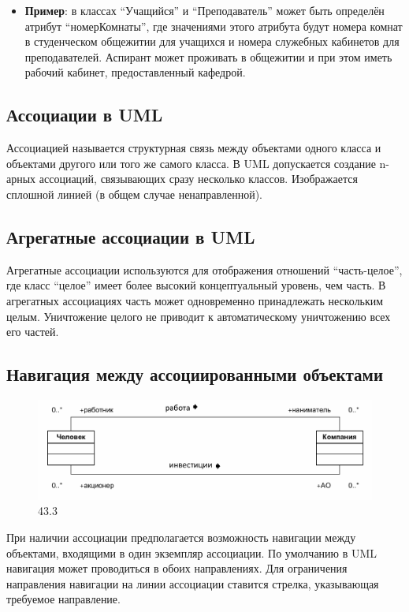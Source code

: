 \documentclass[a4paper,12pt]{article}
\begin{document}
\begin{itemize}
    \item \textbf{Пример}: в классах ``Учащийся'' и ``Преподаватель'' может быть определён атрибут ``номерКомнаты'', где значениями этого атрибута будут номера комнат в студенческом общежитии для учащихся и номера служебных кабинетов для преподавателей. Аспирант может проживать в общежитии и при этом иметь рабочий кабинет, предоставленный кафедрой.
\end{itemize}

\subsection{Ассоциации в UML}

Ассоциацией называется структурная связь между объектами одного класса и объектами другого или того же самого класса. В UML допускается создание n-арных ассоциаций, связывающих сразу несколько классов. Изображается сплошной линией (в общем случае ненаправленной).
\subsection{Агрегатные ассоциации в UML}

Агрегатные ассоциации используются для отображения отношений ``часть-целое'', где класс ``целое'' имеет более высокий концептуальный уровень, чем часть. В агрегатных ассоциациях часть может одновременно принадлежать нескольким целым. Уничтожение целого не приводит к автоматическому уничтожению всех его частей.

\subsection{Навигация между ассоциированными объектами}
\begin{figure}
        \centering
        \includegraphics[width=1\linewidth]{image3.png}
        \caption{43.3}
        \label{fig:enter-label}
    \end{figure}

При наличии ассоциации предполагается возможность навигации между объектами, входящими в один экземпляр ассоциации. По умолчанию в UML навигация может проводиться в обоих направлениях. Для ограничения направления навигации на линии ассоциации ставится стрелка, указывающая требуемое направление.
\end{document}

